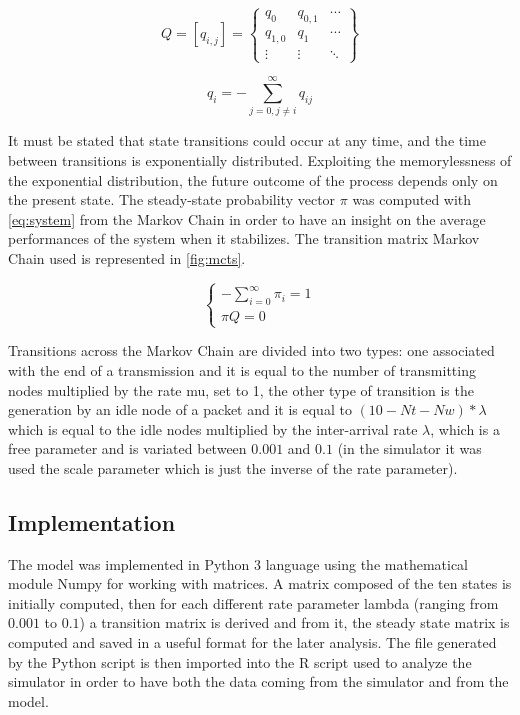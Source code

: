\documentclass[conference]{IEEEtran}
\begin{document}
\begin{equation}
    Q=[q_{i,j}]=\begin{Bmatrix} q_{0} & q_{0,1} & \cdots \\ q_{1,0} & q_{1} & \cdots \\ \vdots & \vdots & \ddots \end{Bmatrix}\label{eq:infinitesimalgenerator}
\end{equation}

\begin{equation}
    q_i=-\sum_{j=0,j\neq i}^{\infty}q_{ij}\label{eq:qi}
\end{equation}

It must be stated that state transitions could occur at any time, and the time between transitions is exponentially distributed. Exploiting the memorylessness of the exponential distribution, the future outcome of the process depends only on the present state. The steady-state probability vector \(\pi\) was computed with \cref{eq:system} from the Markov Chain in order to have an insight on the average performances of the system when it stabilizes. The transition matrix Markov Chain used is represented in \cref{fig:mcts}.

\begin{equation}
    \left\{\begin{matrix} -\sum_{i=0}^{\infty}\pi_i=1 \\ \pi Q=0 \end{matrix}\right.\label{eq:system}
\end{equation}

Transitions across the Markov Chain are divided into two types: one associated with the end of a transmission and it is equal to the number of transmitting nodes multiplied by the rate mu, set to 1, the other type of transition is the generation by an idle node of a packet and it is equal to $ (10 - Nt - Nw)*\lambda $ which is equal to the idle nodes multiplied by the inter-arrival rate $ \lambda $, which is a free parameter and is variated between \(0.001\) and  \(0.1\) (in the simulator it was used the scale parameter which is just the inverse of the rate parameter).

\subsection{Implementation}\label{sec:implementationmodel}
The model was implemented in Python 3 language using the mathematical module Numpy for working with matrices. A matrix composed of the ten states is initially computed, then for each different rate parameter lambda (ranging from \(0.001\) to \(0.1\)) a transition matrix is derived and from it, the steady state matrix is computed and saved in a useful format for the later analysis. The file generated by the Python script is then imported into the R script used to analyze the simulator in order to have both the data coming from the simulator and from the model.
\end{document}
